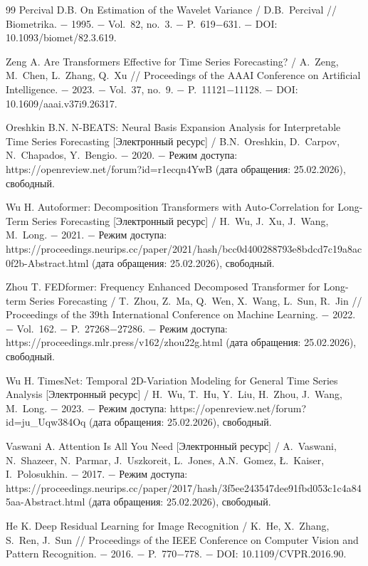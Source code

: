 \documentclass[a4paper,14pt]{extarticle}
\begin{document}
\begin{thebibliography}{99}
 Percival D.B. On Estimation of the Wavelet Variance / D.B.~Percival // Biometrika. − 1995. − Vol.~82, no.~3. − P.~619−631. − DOI: 10.1093/biomet/82.3.619.

 Zeng A. Are Transformers Effective for Time Series Forecasting? / A.~Zeng, M.~Chen, L.~Zhang, Q.~Xu // Proceedings of the AAAI Conference on Artificial Intelligence. − 2023. − Vol.~37, no.~9. − P.~11121−11128. − DOI: 10.1609/aaai.v37i9.26317.

 Oreshkin B.N. N-BEATS: Neural Basis Expansion Analysis for Interpretable Time Series Forecasting [Электронный ресурс] / B.N.~Oreshkin, D.~Carpov, N.~Chapados, Y.~Bengio. − 2020. − Режим доступа: https://openreview.net/forum?id=r1ecqn4YwB (дата обращения: 25.02.2026), свободный.

 Wu H. Autoformer: Decomposition Transformers with Auto-Correlation for Long-Term Series Forecasting [Электронный ресурс] / H.~Wu, J.~Xu, J.~Wang, M.~Long. − 2021. − Режим доступа: https://proceedings.neurips.cc/paper/2021/hash/bcc0d400288793e8bdcd7c19a8ac0f2b-Abstract.html (дата обращения: 25.02.2026), свободный.

 Zhou T. FEDformer: Frequency Enhanced Decomposed Transformer for Long-term Series Forecasting / T.~Zhou, Z.~Ma, Q.~Wen, X.~Wang, L.~Sun, R.~Jin // Proceedings of the 39th International Conference on Machine Learning. − 2022. − Vol.~162. − P.~27268−27286. − Режим доступа: https://proceedings.mlr.press/v162/zhou22g.html (дата обращения: 25.02.2026), свободный.

 Wu H. TimesNet: Temporal 2D-Variation Modeling for General Time Series Analysis [Электронный ресурс] / H.~Wu, T.~Hu, Y.~Liu, H.~Zhou, J.~Wang, M.~Long. − 2023. − Режим доступа: https://openreview.net/forum?id=ju\_Uqw384Oq (дата обращения: 25.02.2026), свободный.

 Vaswani A. Attention Is All You Need [Электронный ресурс] / A.~Vaswani, N.~Shazeer, N.~Parmar, J.~Uszkoreit, L.~Jones, A.N.~Gomez, Ł.~Kaiser, I.~Polosukhin. − 2017. − Режим доступа: https://proceedings.neurips.cc/paper/2017/hash/3f5ee243547dee91fbd053c1c4a845aa-Abstract.html (дата обращения: 25.02.2026), свободный.

 He K. Deep Residual Learning for Image Recognition / K.~He, X.~Zhang, S.~Ren, J.~Sun // Proceedings of the IEEE Conference on Computer Vision and Pattern Recognition. − 2016. − P.~770−778. − DOI: 10.1109/CVPR.2016.90.


\end{thebibliography}
\end{document}
